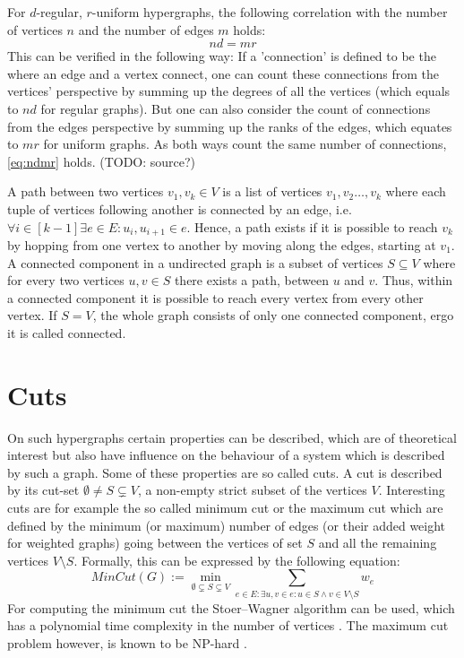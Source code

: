 For $d$-regular, $r$-uniform hypergraphs, the following correlation with the number of vertices $n$ and the number of edges $m$ holds:
\begin{equation}\label{eq:ndmr}
	 n d = m r
\end{equation}
 This can be verified in the following way: If a 'connection' is defined to be the where an edge and a vertex connect, one can count these connections from the vertices' perspective by summing up the degrees of all the vertices (which equals to $nd$ for regular graphs). But one can also consider the count of connections from the edges perspective by summing up the ranks of the edges, which equates to $mr$ for uniform graphs. As both ways count the same number of connections, \cref{eq:ndmr} holds. (TODO: source?)
 
 
A path between two vertices $v_1,v_k\in V$ is a list of vertices $v_1, v_2 \ldots , v_k$ where each tuple of vertices following another is connected by an edge, i.e. $\forall i \in [k-1]\exists e \in E: u_i, u_{i+1} \in e  $. Hence, a path exists if it is possible to reach $v_k$ by hopping from one vertex to another by moving along the edges, starting at $v_1$.
A connected component in a undirected graph is a subset of vertices $S\subseteq V$  where for every two vertices $u,v \in S$ there exists a path, between $u$ and $v$. Thus, within a connected component it is possible to reach every vertex from every other vertex. If $S=V$, the whole graph consists of only one connected component, ergo it is called connected.

\section{Cuts}
On such hypergraphs certain properties can be described, which are of theoretical interest but also have influence on the behaviour of a system which is described by such a graph. Some of these properties are so called cuts. A cut is described by its cut-set $\emptyset \neq S \subsetneq V$, a non-empty strict subset of the vertices  $V$. Interesting cuts are for example the so called minimum cut or the maximum cut which are defined by the minimum (or maximum) number of edges (or their added weight for weighted graphs) going between the vertices of set $S$ and all the remaining vertices $V \setminus S$. Formally, this can be expressed by the following equation: \begin{equation}
MinCut(G) := \min_{\emptyset \subsetneq S \subsetneq V} \sum_{e\in E:\exists u, v \in e: u \in S \land v \in V \setminus S } w_e
\end{equation}
For computing the minimum cut the Stoer–Wagner algorithm can be used, which has a polynomial time complexity in the number of vertices \cite{stoer1997simple}.
The maximum cut problem however, is known to be NP-hard \cite{karp1972reducibility}.

